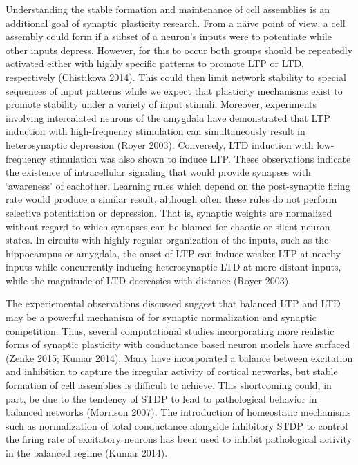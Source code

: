 \documentclass{ucetd}
\begin{document}
Understanding the stable formation and maintenance of cell assemblies is an additional goal of synaptic plasticity research. From a n\"{a}ive point of view, a cell assembly could form if a subset of a neuron's inputs were to potentiate while other inputs depress. However, for this to occur both groups should be repeatedly activated either with highly specific patterns to promote LTP or LTD, respectively (Chistikova 2014). This could then limit network stability to special sequences of input patterns while we expect that plasticity mechanisms exist to promote stability under a variety of input stimuli. Moreover, experiments involving intercalated neurons of the amygdala have demonstrated that LTP induction with high-frequency stimulation can simultaneously result in heterosynaptic depression (Royer 2003). Conversely, LTD induction with low-frequency stimulation was also shown to induce LTP. These observations indicate the existence of intracellular signaling that would provide synapses with `awareness' of eachother. Learning rules which depend on the post-synaptic firing rate would produce a similar result, although often these rules do not perform selective potentiation or depression. That is, synaptic weights are normalized without regard to which synapses can be blamed for chaotic or silent neuron states. In circuits with highly regular organization of the inputs, such as the hippocampus or amygdala, the onset of LTP can induce weaker LTP at nearby inputs while concurrently inducing heterosynaptic LTD at more distant inputs, while the magnitude of LTD decreasies with distance (Royer 2003).

The experiemental observations discussed suggest that balanced LTP and LTD may be a powerful mechanism of for synaptic normalization and synaptic competition. Thus, several computational studies incorporating more realistic forms of synaptic plasticity with conductance based neuron models have surfaced (Zenke 2015; Kumar 2014). Many have incorporated a balance between excitation and inhibition to capture the irregular activity of cortical networks, but stable formation of cell assemblies is difficult to achieve. This shortcoming could, in part, be due to the tendency of STDP to lead to pathological behavior in balanced networks (Morrison 2007). The introduction of homeostatic mechanisms such as normalization of total conductance alongside inhibitory STDP to control the firing rate of excitatory neurons has been used to inhibit pathological activity in the balanced regime (Kumar 2014). 
\end{document}
